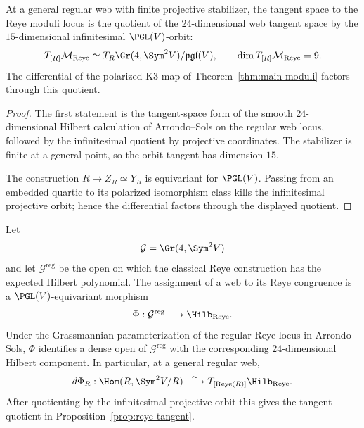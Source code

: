 \begin{proposition}
\label{prop:reye-tangent}
At a general regular web with finite projective stabilizer, the tangent
space to the Reye moduli locus is the quotient of the $24$-dimensional
web tangent space by the $15$-dimensional infinitesimal
$\PGL(V)$-orbit:
\[
 T_{[R]}\mathcal M_{\mathrm{Reye}}
 \simeq
 T_R\Gr(4,\Sym^2V)/\mathfrak{pgl}(V),
 \qquad
 \dim T_{[R]}\mathcal M_{\mathrm{Reye}}=9.
\]
The differential of the polarized-K3 map of
Theorem~\ref{thm:main-moduli} factors through this quotient.
\end{proposition}
\begin{proof}
The first statement is the tangent-space form of the smooth
$24$-dimensional Hilbert calculation of Arrondo--Sols on the regular
web locus, followed by the infinitesimal quotient by projective
coordinates.  The stabilizer is finite at a general point, so the
orbit tangent has dimension $15$.

The construction $R\mapsto Z_R\simeq Y_R$ is equivariant for
$\PGL(V)$.  Passing from an embedded quartic to its polarized
isomorphism class kills the infinitesimal projective orbit; hence the
differential factors through the displayed quotient.
\end{proof}


\begin{proposition}
\label{prop:web-hilbert-bridge}
Let
\[
 \mathcal G=\Gr(4,\Sym^2V)
\]
and let \(\mathcal G^{\mathrm{reg}}\) be the open on which the classical
Reye construction has the expected Hilbert polynomial.  The assignment
of a web to its Reye congruence is a \(\PGL(V)\)-equivariant morphism
\[
 \Phi:\mathcal G^{\mathrm{reg}}
 \longrightarrow \Hilb_{\mathrm{Reye}}.
\]
Under the Grassmannian parameterization of the regular Reye locus in
Arrondo--Sols, \(\Phi\) identifies a dense open of
\(\mathcal G^{\mathrm{reg}}\) with the corresponding
\(24\)-dimensional Hilbert component.  In particular, at a general
regular web,
\[
 d\Phi_R:
 \Hom(R,\Sym^2V/R)
 \xrightarrow{\ \sim\ }
 T_{[\operatorname{Reye}(R)]}\Hilb_{\mathrm{Reye}}.
\]
After quotienting by the infinitesimal projective orbit this gives
the tangent quotient in Proposition~\ref{prop:reye-tangent}.
\end{proposition}

